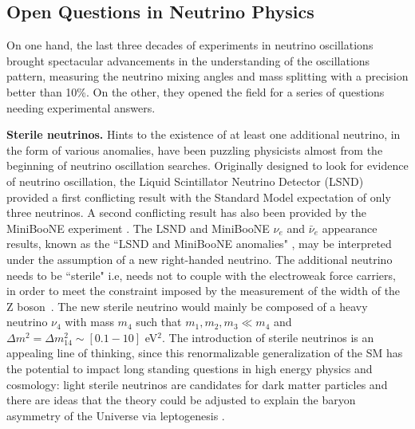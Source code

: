 \subsection{Open Questions in Neutrino Physics}\label{ch:questions}
On one hand, the last three decades of experiments in neutrino oscillations brought spectacular advancements in the understanding of the oscillations pattern, measuring the neutrino mixing angles and mass splitting with a precision better than 10\%.  On the other, they opened the field for a series of questions needing experimental answers. 


\textbf{Sterile neutrinos.} Hints to the existence of at least one additional neutrino, in the form of various anomalies, have been puzzling physicists almost from the beginning of neutrino oscillation searches. 
Originally designed to look for evidence of neutrino oscillation, the Liquid Scintillator Neutrino Detector (LSND) \cite{Athanassopoulos1997} provided a first conflicting result with the Standard Model expectation of only three neutrinos. A second conflicting result has also been provided by the MiniBooNE experiment \cite{AGUILARAREVALO200928}.
The  LSND and MiniBooNE $\nu_e$ and $\bar\nu_e$ appearance results, known as the ``LSND and MiniBooNE anomalies" \cite{Aguilar:2001ty, Athanassopoulos:1997pv, Aguilar-Arevalo:2013pmq}, may be interpreted under the assumption of a new right-handed neutrino. The additional neutrino needs to be ``sterile" i.e, needs not to couple with the electroweak force carriers, in order to meet the constraint imposed by  the measurement of the width of the Z boson~\cite{2006257}.  The new sterile neutrino would mainly be composed of a heavy neutrino $\nu_4$ with mass $m_4$ such that  $m_1, m_2, m_3 \ll m_4$ and  $\Delta m^2= \Delta m^2_{14} \sim [0.1 - 10]$ eV$^2$.
The introduction of sterile neutrinos is an appealing line of thinking, since this renormalizable generalization of the SM has the potential to impact long standing questions in high energy physics and cosmology: light sterile neutrinos are candidates for dark matter particles and there are ideas that the theory could be adjusted to explain the baryon asymmetry of the Universe via leptogenesis \cite{1063-7869-57-5-503}. 

